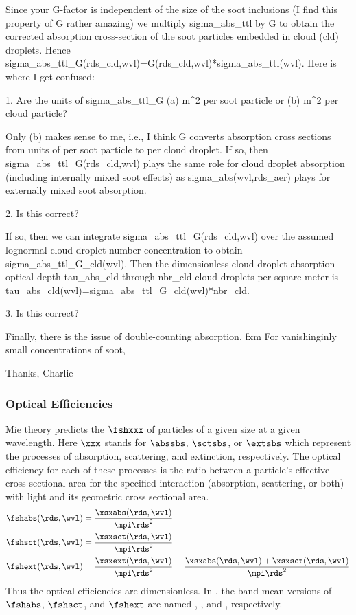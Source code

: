 \documentclass[12pt]{article}
\begin{document}
{Since your G-factor is independent of the size of the soot inclusions
(I find this property of G rather amazing) we multiply sigma_abs_ttl
by G to obtain the corrected absorption cross-section of the soot
particles embedded in cloud (cld) droplets. 
Hence sigma_abs_ttl_G(rds_cld,wvl)=G(rds_cld,wvl)*sigma_abs_ttl(wvl).
Here is where I get confused:

1. Are the units of sigma_abs_ttl_G (a) m^2 per soot particle or
   (b) m^2 per cloud particle?

Only (b) makes sense to me, i.e., I think G converts absorption
cross sections from units of per soot particle to per cloud droplet.
If so, then sigma_abs_ttl_G(rds_cld,wvl) plays the same role for
cloud droplet absorption (including internally mixed soot effects)
as sigma_abs(wvl,rds_aer) plays for externally mixed soot absorption.  

2. Is this correct?

If so, then we can integrate sigma_abs_ttl_G(rds_cld,wvl) over
the assumed lognormal cloud droplet number concentration to obtain
sigma_abs_ttl_G_cld(wvl).
Then the dimensionless cloud droplet absorption optical depth
tau_abs_cld through nbr_cld cloud droplets per square meter is
tau_abs_cld(wvl)=sigma_abs_ttl_G_cld(wvl)*nbr_cld.

3. Is this correct?

Finally, there is the issue of double-counting absorption.
fxm
For vanishinginly small concentrations of soot, 

Thanks,
Charlie
} %

\subsubsection[Optical Efficiencies]{Optical Efficiencies}\label{sxn:fsh_opt}
Mie theory predicts the  $\fshxxx$ of
particles of a given size at a given wavelength. 
Here $\xxx$ stands for $\abssbs$, $\sctsbs$, or $\extsbs$ which
represent the processes of absorption, scattering, and extinction,
respectively. 
The optical efficiency for each of these processes is the ratio
between a particle's effective cross-sectional area for the specified
interaction (absorption, scattering, or both) with light and its
geometric cross sectional area. 
\begin{subequations}
\label{eqn:fsh_opt}
\begin{align}
\label{eqn:fsh_abs_dfn}
\fshabs(\rds,\wvl) & = \frac{\xsxabs(\rds,\wvl)}{\mpi \rds^{2}} \\
\label{eqn:fsh_sct_dfn}
\fshsct(\rds,\wvl) & = \frac{\xsxsct(\rds,\wvl)}{\mpi \rds^{2}} \\
\label{eqn:fsh_ext_dfn}
\fshext(\rds,\wvl) & = \frac{\xsxext(\rds,\wvl)}{\mpi \rds^{2}} = \frac{\xsxabs(\rds,\wvl) + \xsxsct(\rds,\wvl)}{\mpi \rds^{2}}
\end{align}
\end{subequations} 
Thus the optical efficiencies are dimensionless.
In , the band-mean versions of $\fshabs$, $\fshsct$, and 
$\fshext$ are named , , and
, respectively. 
\end{document}
